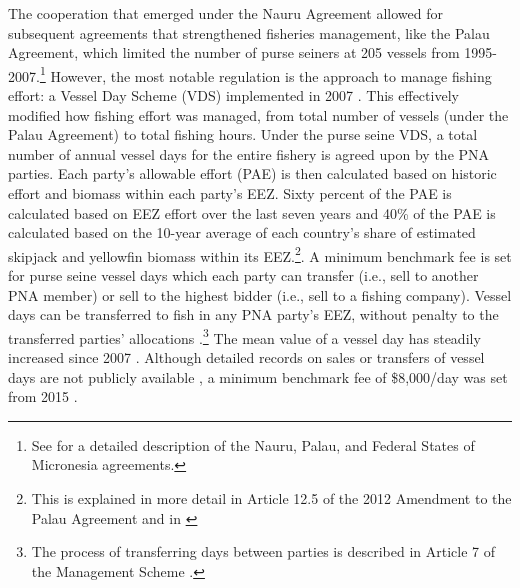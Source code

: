 \documentclass[9pttwoside,lineno]{pnas-new}
\begin{document}
The cooperation that emerged under the Nauru Agreement allowed for subsequent
agreements that strengthened fisheries management, like the Palau
Agreement, which limited the number of purse seiners at 205 vessels from
1995-2007.\footnote{See \cite{havice_2010} for a detailed description of
	the Nauru, Palau, and Federal States of Micronesia agreements.} However, the most notable regulation is
the approach to manage fishing effort: a Vessel Day Scheme (VDS)
implemented in 2007 \citep{havice_2013}. This effectively modified how
fishing effort was managed, from total number of vessels (under the Palau
Agreement) to total fishing hours. 
Under the purse seine VDS, a total number of annual vessel days for the entire fishery is agreed upon by the PNA parties. Each party’s allowable effort (PAE) is then calculated based on historic effort and biomass within each party’s EEZ. Sixty percent of the PAE is calculated based on EEZ effort over the last seven years and 40\% of the PAE is calculated based on the 10-year average of each country’s share of estimated skipjack and yellowfin biomass within its EEZ.\footnote{This is explained in more detail in Article 12.5 of the 2012 Amendment to the Palau Agreement and in \cite{Hagrannsoknir2014}}. A minimum benchmark fee is set for purse seine vessel days which each party can transfer (i.e., sell to another PNA member) or sell to the highest bidder (i.e., sell to a fishing company). Vessel days can be transferred to fish in any PNA party’s EEZ, without penalty to the transferred parties' allocations \cite{PNA2016}.\footnote{The process of transferring days between parties is described in Article 7 of the Management Scheme \cite{PNA2016}.} The mean value of a vessel day has steadily increased since 2007 \citep{havice_2013}. 
Although detailed records on sales or transfers of vessel days are not publicly available \citep{havice_2013,yeeting2018stabilising}, a minimum benchmark fee of \$8,000/day was set from 2015 \citep{PNA2014a}.
\end{document}
